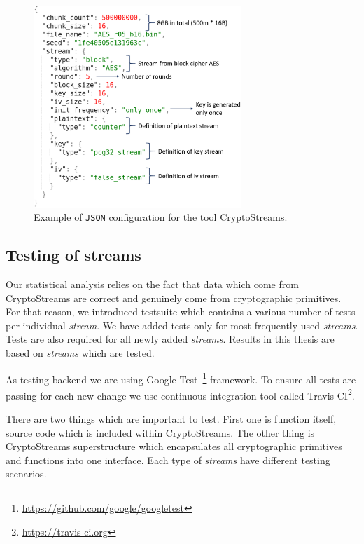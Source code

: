 \documentclass[
    digital,    %
    oneside,    %
    color,
    11pt,
    nocover,
    notable,
    nolof,
    nolot,
    final
]{fithesis3}
\renewcommand\_{\textunderscore\allowbreak}
\begin{document}
\begin{figure}[h]
	\centering
	\includegraphics[width=0.7\textwidth]{./images/pictures/config.png}
	\caption{Example of \texttt{JSON} configuration for the tool CryptoStreams.}
	\label{fig:json-example}
\end{figure}


\subsection{Testing of streams}

Our statistical analysis relies on the fact that data which come from CryptoStreams are correct and genuinely come from cryptographic primitives. For that reason, we introduced testsuite which contains a various number of tests per individual \textit{stream}. We have added tests only for most frequently used \textit{streams}. Tests are also required for all newly added \textit{streams}. Results in this thesis are based on \textit{streams} which are tested.

As testing backend we are using Google Test~\footnote{\url{https://github.com/google/googletest}} framework. To ensure all tests are passing for each new change we use continuous integration tool called Travis CI\footnote{\url{https://travis-ci.org}}.

There are two things which are important to test. First one is function itself, source code which is included within CryptoStreams. The other thing is CryptoStreams superstructure which encapsulates all cryptographic primitives and functions into one interface. Each type of \textit{streams} have different testing scenarios.
\end{document}
